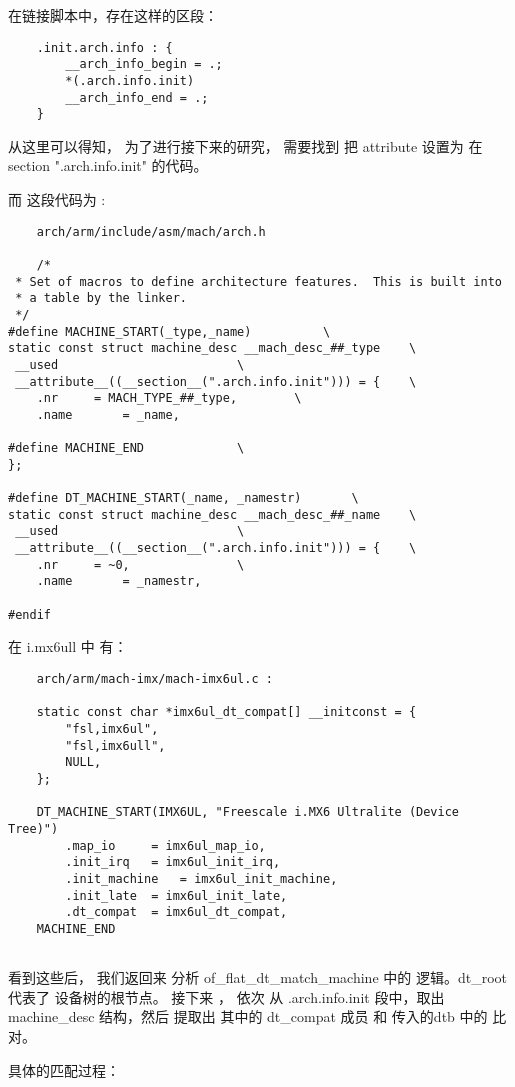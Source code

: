 在链接脚本中，存在这样的区段：
\begin{lstlisting}
    .init.arch.info : {
        __arch_info_begin = .;
        *(.arch.info.init)
        __arch_info_end = .;
    }  
\end{lstlisting}

从这里可以得知， 为了进行接下来的研究， 需要找到  把 attribute 设置为 在 section ".arch.info.init" 的代码。

而 这段代码为 :
\begin{lstlisting}
    arch/arm/include/asm/mach/arch.h

    /*
 * Set of macros to define architecture features.  This is built into
 * a table by the linker.
 */
#define MACHINE_START(_type,_name)			\
static const struct machine_desc __mach_desc_##_type	\
 __used							\
 __attribute__((__section__(".arch.info.init"))) = {	\
	.nr		= MACH_TYPE_##_type,		\
	.name		= _name,

#define MACHINE_END				\
};

#define DT_MACHINE_START(_name, _namestr)		\
static const struct machine_desc __mach_desc_##_name	\
 __used							\
 __attribute__((__section__(".arch.info.init"))) = {	\
	.nr		= ~0,				\
	.name		= _namestr,

#endif

\end{lstlisting}



在 i.mx6ull 中 有：
\begin{lstlisting}
    arch/arm/mach-imx/mach-imx6ul.c :

    static const char *imx6ul_dt_compat[] __initconst = {
        "fsl,imx6ul",
        "fsl,imx6ull",
        NULL,
    };
    
    DT_MACHINE_START(IMX6UL, "Freescale i.MX6 Ultralite (Device Tree)")
        .map_io		= imx6ul_map_io,
        .init_irq	= imx6ul_init_irq,
        .init_machine	= imx6ul_init_machine,
        .init_late	= imx6ul_init_late,
        .dt_compat	= imx6ul_dt_compat,
    MACHINE_END
      
\end{lstlisting}


看到这些后， 我们返回来 分析 of\_flat\_dt\_match\_machine 中的 逻辑。dt\_root 代表了
设备树的根节点。   接下来 ， 依次 从 .arch.info.init 段中，取出 machine\_desc 结构，然后 
提取出 其中的 dt\_compat 成员 和 传入的dtb 中的 比对。 

具体的匹配过程：

